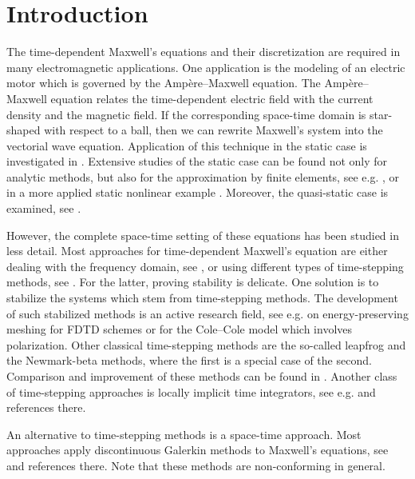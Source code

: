 \documentclass[a4paper,11pt]{article}
\begin{document}
	
\section{Introduction}
	
	The time-dependent Maxwell's equations and their discretization are required in many electromagnetic applications. One application is the modeling of an electric motor which is governed by the Ampère--Maxwell equation. The Ampère--Maxwell equation relates the time-dependent electric field with the current density and the magnetic field. If the corresponding space-time domain is star-shaped with respect to a ball, then we can rewrite Maxwell's system into the vectorial wave equation.
	Application of this technique in the static case is investigated in \cite{TIEGNA2013162}. Extensive studies of the static case can be found not only for analytic methods, but also for the approximation by finite elements, see e.g. \cite{ReviewElectricEdgeFEM}, or in a more applied static nonlinear example \cite{FESurrogateModel}. Moreover, the quasi-static case is examined, see \cite{3dimVectorPot}.
	
	However, the complete space-time setting of these equations has been studied in less detail. Most approaches for time-dependent Maxwell's equation are either dealing with the frequency domain, see \cite{Monk2003}, or using
	different types of	time-stepping methods, see \cite[Chapter~12.2]{Jin}. For the latter, proving stability is delicate. One solution is to stabilize the systems which stem from time-stepping methods. The development of such stabilized methods is an active research field, see e.g. \cite{XIE2021109896} on energy-preserving meshing for FDTD schemes or \cite{bai2022second} for the Cole--Cole model which involves polarization. Other classical time-stepping methods are the so-called leapfrog and the Newmark-beta methods, where the first is a special case of the second. Comparison and improvement of these methods can be found in \cite{crawford2020unconditionally}. Another class of time-stepping approaches is locally implicit time integrators, see e.g. \cite{HochbruckSturm2019} and references there.
	
	An alternative to time-stepping methods is a space-time approach. Most approaches apply discontinuous Galerkin methods to Maxwell's equations, see \cite{AbediMudaliar2017, dorfler2016space, EggerKretzschmarSchneppWeiland2015, LilienthalSchneppWeiland2014, XieWangZhang2013} and references there. Note that these methods are non-conforming in general.
	
\end{document}

